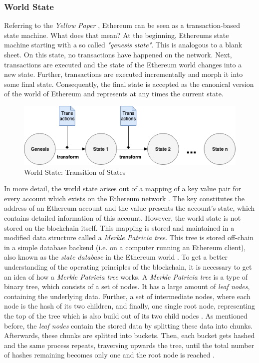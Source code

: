 \subsubsection{World State}
\label{sec:world_state}
Referring to the \textit{Yellow Paper} , Ethereum can be seen as a transaction-based state machine. What does that mean? At the beginning, Ethereums state machine starting with a so called \textit{"genesis state"}. This is analogous to a blank sheet. On this state, no transactions have happened on the network. Next, transactions are executed and the state of the Ethereum world changes into a new state. Further, transactions are executed incrementally and morph it into some final state. Consequently, the final state is accepted as the canonical version of the world of Ethereum and represents at any times the current state.

\begin{figure}[htbp]
	\centering
	\includegraphics[width=.9\linewidth]{./figures/state_transition.png}
	\caption{World State: Transition of States}
	\label{figure:state_transition}
\end{figure}

In more detail, the world state arises out of a mapping of a key value pair for every account which exists on the Ethereum network . The key constitutes the address of an Ethereum account and the value presents the account's state, which contains detailed information of this account. 
However, the world state is not stored on the blockchain itself. This mapping is stored and maintained in a modified data structure called a \textit{Merkle Patricia tree}. This tree is stored off-chain in a simple database backend (i.e. on a computer running an Ethereum client), also known as the \textit{state database} in the Ethereum world . To get a better understanding of the operating principles of the blockchain, it is necessary to get an idea of how a \textit{Merkle Patricia tree} works. A \textit{Merkle Patricia tree} is a type of binary tree, which consists of a set of nodes. It has a large amount of 
\textit{leaf nodes}, containing the underlying data. Further, a set of intermediate nodes, where each node is the hash of its two children, and finally, one single root node, representing the top of the tree which is also build out of its two child nodes  .
As mentioned before, the \textit{leaf nodes} contain the stored data by splitting these data into chunks. Afterwards, these chunks are splitted into buckets. Then, each bucket gets hashed and the same process repeats, traversing upwards the tree, until the total number of hashes remaining becomes only one and the root node is reached . 

